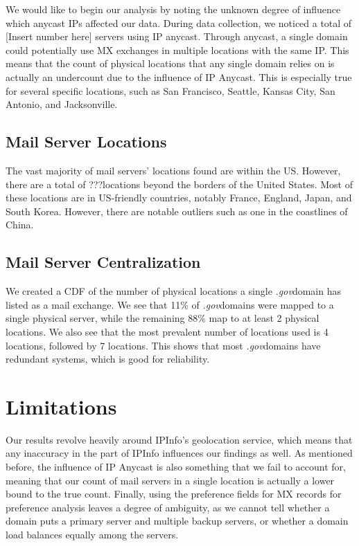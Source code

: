 \documentclass{hotnets21}
\newcommand{\dotgov}{\textit{.gov}\space}
\newcommand{\foreignmslocations}{???\space}
\begin{document}
We would like to begin our analysis by noting the unknown degree of influence which anycast IPs affected our data.
During data collection, we noticed a total of [Insert number here] servers using IP anycast.
Through anycast, a single domain could potentially use MX exchanges in multiple locations with the same IP.
This means that the count of physical locations that any single domain relies on is actually an undercount due to the influence of IP Anycast.
This is especially true for several specific locations, such as San Francisco, Seattle, Kansas City, San Antonio, and Jacksonville.

\subsection{Mail Server Locations}

The vast majority of mail servers’ locations found are within the US.
However, there are a total of \foreignmslocations locations beyond the borders of the United States.
Most of these locations are in US-friendly countries, notably France, England, Japan, and South Korea.
However, there are notable outliers such as one in the coastlines of China.

\subsection{Mail Server Centralization}

We created a CDF of the number of physical locations a single \dotgov domain has listed as a mail exchange.
We see that 11\% of \dotgov domains were mapped to a single physical server, while the remaining 88\% map to at least 2 physical locations.
We also see that the most prevalent number of locations used is 4 locations, followed by 7 locations.
This shows that most \dotgov domains have redundant systems, which is good for reliability.

\section{Limitations}

Our results revolve heavily around IPInfo’s geolocation service, which means that any inaccuracy in the part of IPInfo influences our findings as well.
As mentioned before, the influence of IP Anycast is also something that we fail to account for, meaning that our count of mail servers in a single location is actually a lower bound to the true count.
Finally, using the preference fields for MX records for preference analysis leaves a degree of ambiguity, as we cannot tell whether a domain puts a primary server and multiple backup servers, or whether a domain load balances equally among the servers.
\end{document}
